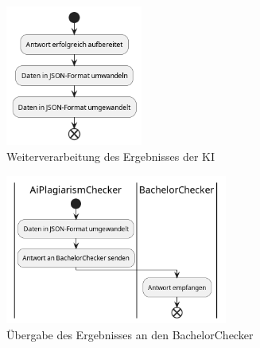 \begin{figure}[H]
    \centering
    \includegraphics[width=0.4\textwidth]{images/diagrams/bpd/WeiterverarbeitungDesErgebnissesDerKI/GPD-Weiterverarbeitung des Ergebnisses der KI.png}
    \caption{Weiterverarbeitung des Ergebnisses der KI}
    \label{fig:weiterverarbeitungDesErgebnissesDerKI}
\end{figure}

\begin{figure}[H]
    \centering
    \includegraphics[width=0.65\textwidth]{images/diagrams/bpd/ÜbergabeDesErgebnissesAnDenBachelorChecker/GPD-Übergabe des Ergebnisses an den BachelorChecker.png}
    \caption{Übergabe des Ergebnisses an den BachelorChecker}
    \label{fig:uebergabeDesErgebnissesAnDenBachelorChecker}
\end{figure}

